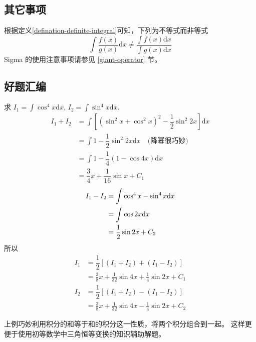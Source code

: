 \subsection{其它事项}

根据定义\ref{defination-definite-integral}可知，下列为不等式而非等式
\[
    \int \dfrac{f(x)}{g(x)} \mathrm{d}x 
    \neq 
    \dfrac{\int f(x) \mathrm{d} x}{\int g(x) \mathrm{d} x}
\]
Sigma 的使用注意事项请参见 \ref{giant-operator} 节。

\subsection{好题汇编}

\begin{example}
    求 $I_1 = \int \cos ^4 x \mathrm{d} x$, $I_2 = \int \sin ^4 x \mathrm{d} x$.
    \begin{align*}
        I_1 + I_2 &= \int 
                    \left[
                        (\sin ^2 x + \cos ^2 x)^2 - \dfrac{1}{2} \sin ^2 2x
                    \right] \mathrm{d}x \\
                  &= \int 1 - \dfrac{1}{2} \sin ^2 2x \mathrm{d} x \quad \mbox{(降幂很巧妙)}\\
                  &= \int 1 - \dfrac{1}{4} (1-\cos 4x) \mathrm{d} x \\
                  &= \dfrac{3}{4} x + \dfrac{1}{16} \sin x + C_1
    \end{align*}
    \begin{align}
        I_1 - I_2 &= \int \cos ^4 x - \sin ^4 x \mathrm{d}x \notag \\
                  &= \int \cos 2x \mathrm{d}x \label{eq:app-trig-double-angle-1} \\
                  &= \dfrac{1}{2} \sin 2x +C_2 \notag
    \end{align}
    所以
    \begin{align*}
        I_1 &= \dfrac{1}{2} \left[(I_1+I_2)+(I_1-I_2)\right] \\
            &= \frac{3}{8} x + \frac{1}{32} \sin 4x + \frac{1}{4} \sin 2x + C_1 \\
        I_2 &= \dfrac{1}{2} \left[(I_1+I_2)-(I_1-I_2)\right] \\
            &= \frac{3}{8} x + \frac{1}{32} \sin 4x - \frac{1}{4} \sin 2x + C_2
    \end{align*}
    \cite[page 26, question 57]{w660ans}
\end{example}
上例巧妙利用积分的和等于和的积分这一性质，将两个积分组合到一起。
这样更便于使用初等数学中三角恒等变换的知识辅助解题。

